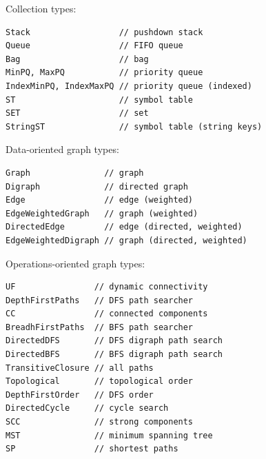\documentclass[8pt,a4paper,compress]{beamer}
\begin{document}
\begin{frame}[fragile]
Collection types:
\begin{lstlisting}[language={},mathescape]
Stack                  // pushdown stack
Queue                  // FIFO queue
Bag                    // bag
MinPQ, MaxPQ           // priority queue
IndexMinPQ, IndexMaxPQ // priority queue (indexed)
ST                     // symbol table
SET                    // set
StringST               // symbol table (string keys)
\end{lstlisting}

\bigskip

Data-oriented graph types:
\begin{lstlisting}[language={},mathescape]
Graph               // graph
Digraph             // directed graph
Edge                // edge (weighted)
EdgeWeightedGraph   // graph (weighted)
DirectedEdge        // edge (directed, weighted)
EdgeWeightedDigraph // graph (directed, weighted)
\end{lstlisting}

\bigskip

Operations-oriented graph types:
\begin{lstlisting}[language={},mathescape]
UF                // dynamic connectivity
DepthFirstPaths   // DFS path searcher
CC                // connected components
BreadhFirstPaths  // BFS path searcher
DirectedDFS       // DFS digraph path search
DirectedBFS       // BFS digraph path search
TransitiveClosure // all paths
Topological       // topological order
DepthFirstOrder   // DFS order
DirectedCycle     // cycle search
SCC               // strong components
MST               // minimum spanning tree
SP                // shortest paths
\end{lstlisting}
\end{frame}
\end{document}
